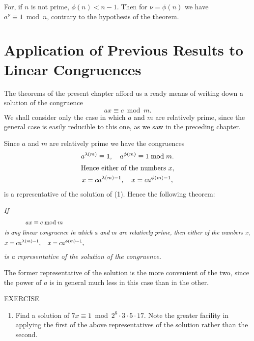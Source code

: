 \documentclass[oneside]{book}
\begin{document}
For, if $n$ is not prime, $\phi(n) < n - 1$. Then for $\nu =
\phi(n)$ we have $a^{\nu} \equiv 1 \bmod n$, contrary to the
hypothesis of the theorem.

\section{Application of Previous Results to Linear
Congruences}\label{s30}%

The theorems of the present chapter afford us a ready means of
writing down a solution of the congruence
\begin{equation}
ax \equiv c \bmod m. \tag{1}
\end{equation}
We shall consider only the case in which $a$ and $m$ are relatively
prime, since the general case is easily reducible to this one, as we
saw in the preceding chapter.

Since $a$ and $m$ are relatively prime we have the congruences
\begin{gather*}
a^{\lambda(m)} \equiv 1,\quad a^{\phi(m)} \equiv 1 \bmod m. \\
\intertext{Hence either of the numbers $x$,}
x = ca^{\lambda(m)-1},\quad x = ca^{\phi(m)-1},
\end{gather*}
is a representative of the solution of (1). Hence the following
theorem:

\smallskip \emph{If}
\begin{gather*}
ax \equiv c \bmod m \\
\intertext{\emph{is any linear congruence in which $a$ and $m$ are
relatively prime, then either of the numbers $x$,}}
x = ca^{\lambda(m)-1},\quad x = ca^{\phi(m)-1},
\end{gather*}
\emph{is a representative of the solution of the congruence.}

The former representative of the solution is the more convenient of
the two, since the power of $a$ is in general much less in this case
than in the other.

\begin{center}
EXERCISE
\end{center}

\small \begin{enumerate}
\item[ ] Find a solution of $7x \equiv 1 \bmod 2^6 \cdot 3 \cdot 5 \cdot
17.$ Note the greater facility in applying the first of the above
representatives of the solution rather than the second.
\end{enumerate} \normalsize
\end{document}
